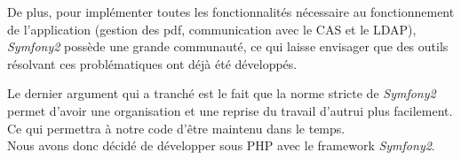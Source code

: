 De plus, pour implémenter toutes les fonctionnalités nécessaire au fonctionnement de l'application (gestion des pdf, communication avec le CAS et le LDAP), \textit{Symfony2} possède une grande communauté, ce qui laisse envisager que des outils résolvant ces problématiques ont déjà été développés.

Le dernier argument qui a tranché est le fait que la norme stricte de \textit{Symfony2} permet d'avoir une organisation et une reprise du travail d'autrui plus facilement. Ce qui permettra à notre code d'être maintenu dans le temps.\\

Nous avons donc décidé de développer sous PHP avec le framework \textit{Symfony2}.